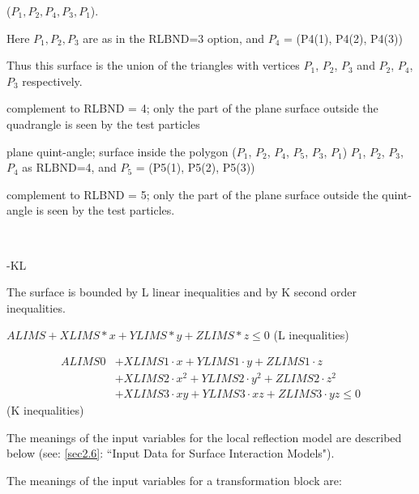 \begin{description}
\begin{description}
                ($P_1, P_2, P_4, P_3, P_1$).

                Here $P_1, P_2, P_3$ are as in the RLBND=3 option, and $P_4$ = (P4(1), P4(2),
                P4(3)) 

                Thus this surface is the union of the triangles with vertices $P_1$, $P_2$,
                $P_3$ and $P_2$, $P_4$, $P_3$ respectively.
          \item[$= 4.5$] complement to RLBND = 4; only the part of the plane surface
                outside the quadrangle is seen by the test particles
          \item[$= 5$] plane
                quint-angle; surface inside the polygon ($P_1$, $P_2$, $P_4$, $P_5$, $P_3$,
                $P_1$) $P_1$, $P_2$, $P_3$, $P_4$ as RLBND=4, and $P_5$ = (P5(1), P5(2), P5(3))
          \item[$= 5.5$] complement to RLBND = 5; only the part of the plane surface
                outside the quint-angle is seen by the test particles.
        \end{description}
  \item[RLBND < 0] ~ 

        -KL 

        The surface is bounded by L linear inequalities and by K second order
        inequalities.

        $ALIMS + XLIMS	*  x + YLIMS  *  y + ZLIMS  *  z \le 0 $ \raggedleft (L
        inequalities) 

        \begin{align}
          ALIMS0 & + XLIMS1  \cdot	x + YLIMS1	\cdot  y + ZLIMS1
          \cdot  z \nonumber                                                 \\
                 & + XLIMS2  \cdot  x^2 + YLIMS2  \cdot  y^2 + ZLIMS2  \cdot
          z^2
          \nonumber
          \\
                 & + XLIMS3  \cdot  xy + YLIMS3  \cdot	xz + ZLIMS3  \cdot  yz
          \le 0
          \nonumber
        \end{align}
        \raggedleft (K inequalities)
\end{description}

The meanings of the input variables for the local reflection model are
described below (see: \cref{sec2.6}: ``Input Data for Surface Interaction
Models").

The meanings of the input variables for a transformation block are:

